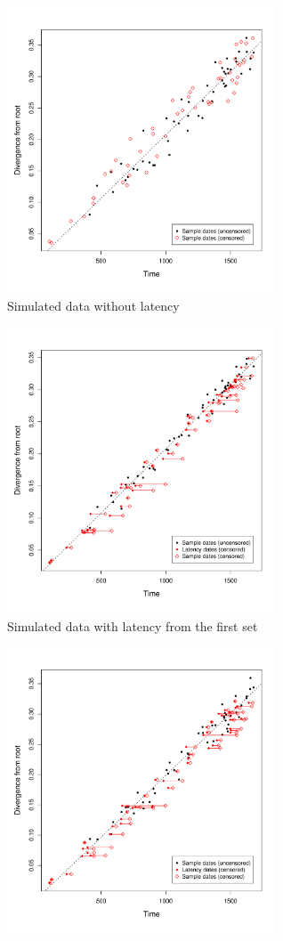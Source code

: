 \documentclass[12pt]{article}
\begin{document}
\begin{figure}[ht]
	\centering
	\begin{subfigure}[ht]{12cm}
		\centering
		\includegraphics[width=8cm]{figures/simulated.pdf}
		\caption{Simulated data without latency}
		\label{fig:resultssimulated}
	\end{subfigure}
	\begin{subfigure}[ht]{8cm}
		\includegraphics[width=8cm]{figures/simulated_latent1.pdf}
		\caption{Simulated data with latency from the first set}
		\label{fig:resultslatent1}
	\end{subfigure}
	\begin{subfigure}[ht]{8cm}
		\includegraphics[width=8cm]{figures/simulated_latent2.pdf}

\end{subfigure}
\end{figure}
\end{document}
